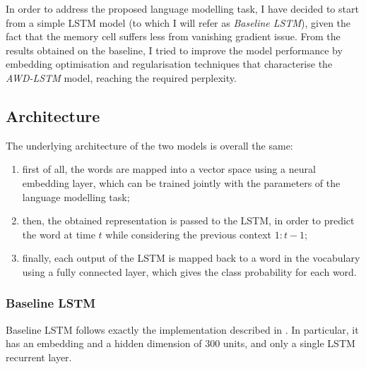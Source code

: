 
In order to address the proposed language modelling task, I have decided to start from a simple LSTM model (to which I will refer as \textit{Baseline LSTM}), given the fact that the memory cell suffers less from vanishing gradient issue. From the results obtained on the baseline, I tried to improve the model performance by embedding optimisation and regularisation techniques that characterise the \textit{AWD-LSTM} model, reaching the required perplexity.

\subsection{Architecture}
\label{subsec:architecture}
The underlying architecture of the two models is overall the same:
\begin{enumerate}
    \item first of all, the words are mapped into a vector space using a neural embedding layer, which can be trained jointly with the parameters of the language modelling task;
    \item then, the obtained representation is passed to the LSTM, in order to predict the word at time $t$ while considering the previous context $1:t-1$;
    \item finally, each output of the LSTM is mapped back to a word in the vocabulary using a fully connected layer, which gives the class probability for each word.
\end{enumerate}

\subsubsection{Baseline LSTM}
Baseline LSTM follows exactly the implementation described in . In particular, it has an embedding and a hidden dimension of $300$ units, and only a single LSTM recurrent layer. 

